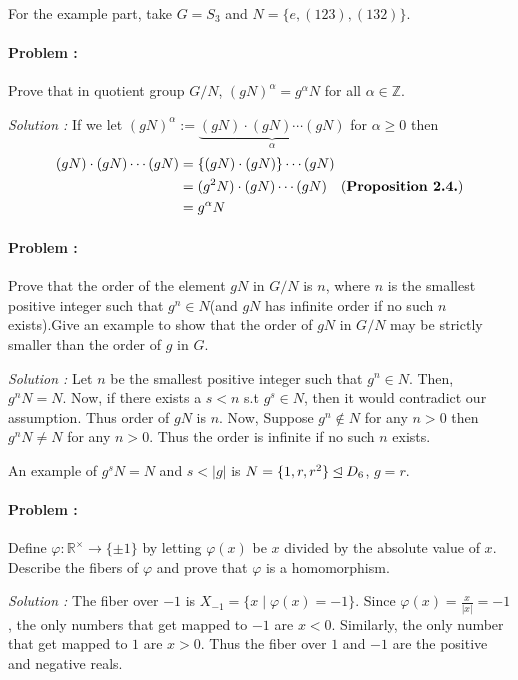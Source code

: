 For the example part, take $G= S_3$ and $N = \{e,(123),(132)\}$.

\paragraph{Problem :} Prove that in quotient group $G/N$, $(gN)^{\alpha} = g^{\alpha} N$ for all $\alpha \in \mathbb{Z}$.

\vspace{4mm}
\textit{Solution :} If we let $(gN)^{\alpha} := \underbrace{(gN) \cdot (gN) \cdots (gN)}_{\alpha}$ for $\alpha \ge 0$ then 
\begin{align*}
    (gN) \cdot (gN) \cdots (gN) &= \{(gN) \cdot (gN) \} \cdots (gN) \\
    &= (g^2N) \cdot (gN) \cdots (gN)  \quad \text{(\textbf{Proposition 2.4.})} \\
    &= g^\alpha N
\end{align*}

\paragraph{Problem :} Prove that the order of the element $gN$ in $G/N$ is $n$, where $n$ is the smallest positive integer such that 
$g^n \in N$(and $gN$ has infinite order if no such $n$ exists).Give an example to show that the order of $gN$ in $G/N$ may be strictly 
smaller than the order of $g$ in $G$.

\vspace{4mm}
\textit{Solution :} Let $n$ be the smallest positive integer such that $g^n \in N$. Then, $g^nN=N$.
Now, if there exists a $s < n$ s.t $g^s \in N$, then it would contradict our assumption. Thus order of $gN$ is $n$.  
Now, Suppose $g^n \not \in N$ for any $n > 0$ then $g^nN \neq N$ for any $n > 0$. Thus the order is infinite if no such $n$ exists.

An example of $g^sN = N$ and $s < |g|$ is $N=\{1,r,r^2\} \unlhd D_6$, $g=r$.

\paragraph{Problem :} Define $\varphi : \mathbb{R}^{\times} \to \{\pm 1\}$ by letting $\varphi(x)$ be $x$ divided by the absolute value of $x$.
Describe the fibers of $\varphi$ and prove that $\varphi$ is a homomorphism.

\vspace{4mm}
\textit{Solution :} The fiber over $-1$ is $X_{-1} = \{ x \mid \varphi(x) = -1\}$. Since $\varphi(x)= \frac{x}{|x|}=-1$, the only numbers
that get mapped to $-1$ are $x < 0$. Similarly, the only number that get mapped to $1$ are $x > 0$. Thus the fiber over $1$ and $-1$ are the 
positive and negative reals.

